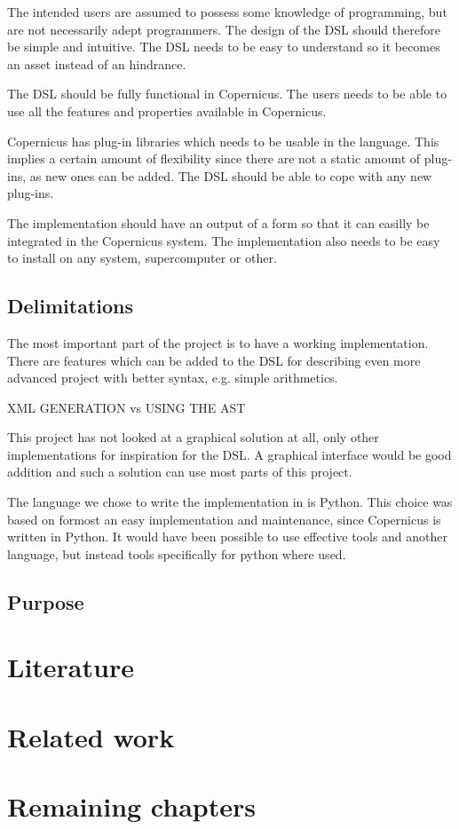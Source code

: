 The intended users are assumed to possess some knowledge of
programming, but are not necessarily adept programmers. The design of
the DSL should therefore be simple and intuitive. The DSL needs to be
easy to understand so it becomes an asset instead of an hindrance.

The DSL should be fully functional in Copernicus. The users needs to
be able to use all the features and properties available in
Copernicus.

Copernicus has plug-in libraries which needs to be usable in the
language. This implies a certain amount of flexibility since there are
not a static amount of plug-ins, as new ones can be added. The DSL
should be able to cope with any new plug-ins.

The implementation should have an output of a form so that it can
easilly be integrated in the Copernicus system. The implementation
also needs to be easy to install on any system, supercomputer or
other.

\subsection{Delimitations}
The most important part of the project is to have a working
implementation. There are features which can be added to the DSL for
describing even more advanced project with better syntax, e.g. simple
arithmetics.

XML GENERATION vs USING THE AST

This project has not looked at a graphical solution at all, only other
implementations for inspiration for the DSL. A graphical interface
would be good addition and such a solution can use most parts of this
project.

The language we chose to write the implementation in is Python. This
choice was based on formost an easy implementation and maintenance,
since Copernicus is written in Python. It would have been possible to
use effective tools and another language, but instead tools
specifically for python where used.


\subsection{Purpose}

\section{Literature}


\section{Related work}

\section{Remaining chapters}

